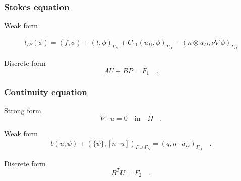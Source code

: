 \documentclass{beamer}
\begin{document}
\begin{frame}
\frametitle{Stokes equation}
\begin{block}{Weak form}

\begin{equation}
\begin{split}
l_{IP}(\phi) = (f,\phi) + (t,\phi)_{\Gamma_N} + C_{11} (u_D,\phi)_{\Gamma_D} - (n \otimes u_D, \nu \nabla \phi)_{\Gamma_D}
\end{split}
\end{equation}

\end{block}

\begin{block}{Discrete form}
\begin{equation} \label{stokes discrete_ch3}
AU + BP = F_1 \quad \textrm{.}
\end{equation}
\end{block}

\end{frame}

\begin{frame}
\frametitle{Continuity equation}

\begin{block}{Strong form}
\begin{equation}
\nabla \cdot u = 0 \quad \textrm{in} \quad \Omega \quad \textrm{.}
\end{equation}
\end{block}

\begin{block}{Weak form}
\begin{equation}\label{contiuity_weak_ch3}
\begin{split}
b(u,\psi) + (\{\psi\},[n\cdot u])_{\Gamma \cup \Gamma_D} = (q,n\cdot u_D)_{\Gamma_D} \quad \textrm{.}
\end{split}
\end{equation}
\end{block}

\begin{block}{Discrete form}
\begin{equation} \label{continuity discrete_ch3}
B^T U  = F_2 \quad \textrm{.}
\end{equation}
\end{block}

\end{frame}
\end{document}
